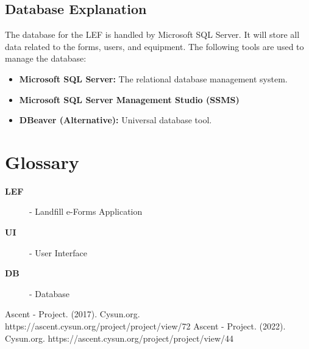 \documentclass[12pt]{article}
\begin{document}
\subsection{Database Explanation}
The database for the LEF is handled by Microsoft SQL Server. It will store all data related to the forms, users, and equipment. The following tools are used to manage the database:
\begin{itemize}
     \item \textbf{Microsoft SQL Server:} The relational database management system.
     \item \textbf{Microsoft SQL Server Management Studio (SSMS)}
     \item \textbf{DBeaver (Alternative):} Universal database tool.
 \end{itemize}
\newpage

\section*{Glossary}
\begin{description}
    \item[\textbf{LEF}] - Landfill e-Forms Application
    \item[\textbf{UI}] - User Interface
    \item[\textbf{DB}] - Database 
\end{description}
\newpage

\begin{thebibliography}{9}
     Ascent - Project. (2017). Cysun.org. https://ascent.cysun.org/project/project/view/72
     Ascent - Project. (2022). Cysun.org. https://ascent.cysun.org/project/project/view/44
\end{thebibliography}
\end{document}

